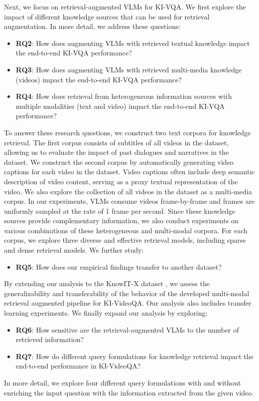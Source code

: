 Next, we focus on retrieval-augmented VLMs for KI-VQA. We first explore the impact of different knowledge sources that can be used for retrieval augmentation. In more detail, we address these questions:
\begin{itemize}[leftmargin=*]
    \item \textbf{RQ2}: How does augmenting VLMs with retrieved textual knowledge impact the end-to-end KI-VQA performance? 
    \item \textbf{RQ3}: How does augmenting VLMs with retrieved multi-media knowledge (videos) impact the end-to-end KI-VQA performance?
    \item \textbf{RQ4}: How does retrieval from heterogeneous information sources with multiple modalities (text and video) impact the end-to-end KI-VQA performance? 
\end{itemize}



To answer these research questions, we construct two text corpora for knowledge retrieval. The first corpus consists of subtitles of all videos in the dataset, allowing us to evaluate the impact of past dialogues and narratives in the dataset. We construct the second corpus by automatically generating video captions for each video in the dataset. Video captions often include deep semantic description of video content, serving as a proxy textual representation of the video.  We also explore the collection of all videos in the dataset as a multi-media corpus.  In our experiments, VLMs consume videos frame-by-frame and frames are uniformly sampled at the rate of 1 frame per second. Since these knowledge sources provide complementary information, we also conduct experiments on various combinations of these heterogeneous and multi-modal corpora. For each corpus, we explore three diverse and effective retrieval models, including sparse and dense retrieval models.
We further study:
\begin{itemize}[leftmargin=*]
    \item \textbf{RQ5}: How does our empirical findings transfer to another dataset?
\end{itemize}
By extending our analysis to the KnowIT-X dataset \cite{wu2021transferring}, we assess the generalizability and transferability of the behavior of the developed multi-modal retrieval augmented pipeline for KI-VideoQA. Our analysis also includes transfer learning experiments. 
We finally expand our analysis by exploring:
\begin{itemize}[leftmargin=*]
    \item \textbf{RQ6}: How sensitive are the retrieval-augmented VLMs to the number of retrieved information?
    \item \textbf{RQ7}: How do different query formulations for knowledge retrieval impact the end-to-end performance in KI-VideoQA?
\end{itemize}
In more detail, we explore four different query formulations with and without enriching the input question with the information extracted from the given video. 

